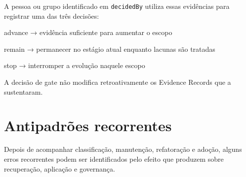 \documentclass[
  10pt,
  a4paper,
  oneside]{book}
\newenvironment{Shaded}{}{}
\newcommand{\NormalTok}[1]{#1}
\renewenvironment{Shaded}{\begin{snugshade}}{\end{snugshade}}%
\begin{document}
A pessoa ou grupo identificado em \texttt{decidedBy} utiliza essas
evidências para registrar uma das três decisões:

\begin{Shaded}
\begin{Highlighting}[]
\NormalTok{advance}
\NormalTok{→ evidência suficiente para aumentar o escopo}

\NormalTok{remain}
\NormalTok{→ permanecer no estágio atual enquanto lacunas são tratadas}

\NormalTok{stop}
\NormalTok{→ interromper a evolução naquele escopo}
\end{Highlighting}
\end{Shaded}

A decisão de gate não modifica retroativamente os Evidence Records que a
sustentaram.

\hypertarget{antipadruxf5es-recorrentes}{%
\section{Antipadrões recorrentes}\label{antipadruxf5es-recorrentes}}

Depois de acompanhar classificação, manutenção, refatoração e adoção,
alguns erros recorrentes podem ser identificados pelo efeito que
produzem sobre recuperação, aplicação e governança.
\end{document}
